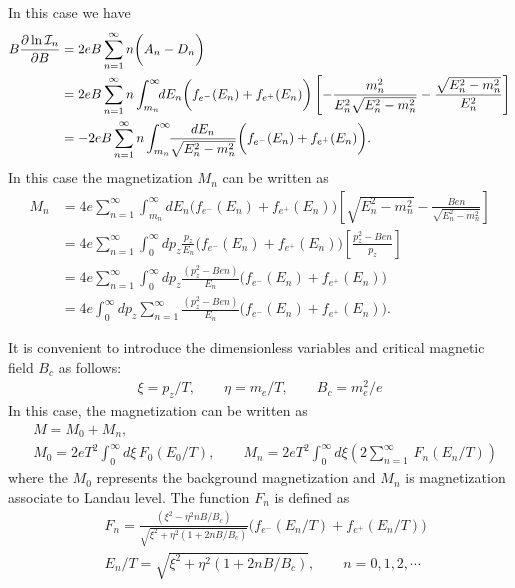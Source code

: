 \documentclass[sn-mathphys,Numbered]{sn-jnl}
\theoremstyle{thmstyleone}%
\theoremstyle{thmstyletwo}%
\theoremstyle{thmstylethree}%
\begin{document}
In this case we have
\begin{align}
B\frac{\partial\ln\mathcal{I}_n}{\partial B}&=2eB\sum_{n=1}^\infty n\bigg(A_n-D_n\bigg)\notag\\
&=2eB\sum_{n=1}^\infty n\int_{m_n}^\infty\!\!dE_n \bigg(f_{e^-}(E_n)+f_{e^+}(E_n)\bigg)\left[-\frac{m^2_n}{E^2_{n}\sqrt{E^2_n-m^2_n}}-\frac{\sqrt{E^2_n-m^2_n}}{E^2_{n}}\right]\notag\\
&=-2eB\sum_{n=1}^\infty n\int_{m_n}^\infty\!\!\frac{dE_n}{\sqrt{E^2_n-m^2_n}} \bigg(f_{e^-}(E_n)+f_{e^+}(E_n)\bigg).
\end{align}
In this case the magnetization $M_n$ can be written as
\begin{align}
M_n&=4e\sum_{n=1}^\infty \int_{m_n}^\infty\!\!dE_n\bigg(f_{e^-}(E_n)+f_{e^+}(E_n)\bigg)\left[{\sqrt{E^2_n-m^2_n}}-\frac{Ben}{\sqrt{E^2_n-m^2_n}}\right]\\
&=4e\sum_{n=1}^\infty \int_{0}^\infty\!\!dp_z\frac{p_z}{E_n}\bigg(f_{e^-}(E_n)+f_{e^+}(E_n)\bigg)\left[\frac{p_z^2-Ben}{p_z}\right]\\
&=4e\sum_{n=1}^\infty \int_{0}^\infty\!\!dp_z\frac{(p_z^2-Ben)}{E_n}\bigg(f_{e^-}(E_n)+f_{e^+}(E_n)\bigg)\\
&=4e \int_{0}^\infty\!\!dp_z\sum_{n=1}^\infty\frac{(p_z^2-Ben)}{E_n}\bigg(f_{e^-}(E_n)+f_{e^+}(E_n)\bigg).
\end{align}


It is convenient to introduce the dimensionless variables and critical magnetic field $B_c$ as follows:
\begin{align}
\xi=p_z/T,\qquad \eta=m_e/T,\qquad B_c=m^2_e/e
\end{align}
In this case, the magnetization can be written as
\begin{align}
&M=M_0+M_n,\\
&M_0=2eT^2\int_0^\infty\!\!d\xi\, F_0(E_0/T),\qquad M_n=2eT^2\int_{0}^\infty\!\!d\xi\left(2\sum_{n=1}^\infty\,F_n(E_n/T)\right)
\end{align}
where the $M_0$ represents the background magnetization  and $M_n$ is magnetization associate to Landau level. The function $F_n$ is defined as
\begin{align}
 &F_n=\frac{(\xi^2-\eta^2nB/B_c)}{\sqrt{\xi^2+\eta^2\left(1+2nB/B_c\right)}}\bigg(f_{e^-}(E_n/T)+f_{e^+}(E_n/T)\bigg)\\
&E_n/T=\sqrt{\xi^2+\eta^2\left(1+2nB/B_c\right)},\qquad n=0,1,2,\cdots
\end{align}
\end{document}
